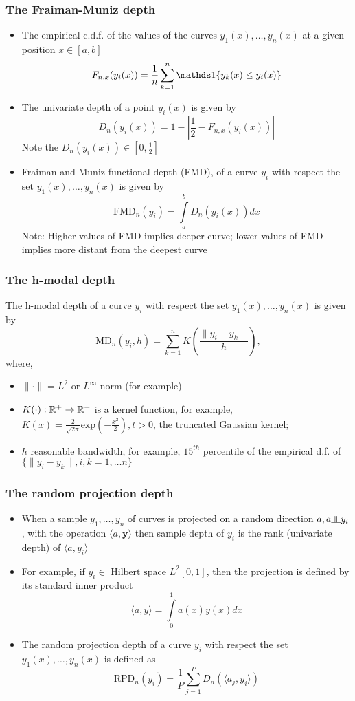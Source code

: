 \documentclass[10pt,dvipsnames,table]{beamer}
\begin{document}
\begin{frame}
\frametitle{The Fraiman-Muniz depth}
\small
\begin{itemize}
\item The empirical c.d.f. of the values of the curves $y_1(x), \dots , y_n(x)$ at a given position $x \in [a, b]$
\[ F_{n,x} (y_i (x)) = \frac{1}{n}\sum\limits_{k=1}^{n} \Ind\{ y_k(x) \leq y_i(x)\}\]
\item The univariate depth of a point $y_i(x)$ is given by
\[ D_n(y_i(x)) = 1 - \left| \frac{1}{2} - F_{n,x} (y_i (x)) \right| \]
Note the $D_n(y_i(x)) \in [0, \frac{1}{2}]$
\item Fraiman and Muniz functional depth (FMD), of a curve $y_i$ with respect the set $y_1(x), \dots , y_n(x)$ is given by 
\[ \text{FMD}_n(y_i) = \int\limits_a^b D_n(y_i(x)) dx \]
Note: Higher values of FMD implies deeper curve; lower values of FMD implies more distant from the deepest curve
\end{itemize}
\end{frame}

\begin{frame}
\frametitle{The h-modal depth}
The h-modal depth of a curve $y_i$ with respect the set $y_1(x), \dots , y_n(x)$ is given by
\[ \text{MD}_n(y_i, h) = \sum\limits_{k = 1}^n K\left( \frac{\|y_i - y_k \|}{h} \right),\]
where, \begin{itemize}
\item $\|\cdot\| = L^2 \text{ or } L^{\infty}$ norm (for example)
\item $K(\cdot): \mathbb{R}^{+} \rightarrow \mathbb{R}^{+}$ is a kernel function, for example, $K(x) = \frac{2}{\sqrt{2\pi}} \text{exp}\left(-\frac{x^2}{2}\right), t > 0$, the truncated Gaussian kernel;
\item $h$ reasonable bandwidth, for example, $15^{th}$ percentile of the empirical d.f. of $\{ \|y_i - y_k \|, i, k = 1, \dots n \}$
\end{itemize}
\end{frame}

\begin{frame}
\frametitle{The random projection depth}
\begin{itemize}
\item When a sample $y_1, \dots, y_n$ of curves is projected on a random direction $a, a \indep y_i$, with the operation $ \langle a, \mathbf{y} \rangle$ then sample depth of $y_i$ is the rank (univariate depth) of $ \langle a, y_i \rangle$
\item For example, if $y_i \in \text{ Hilbert space } L^2[0,1]$, then the projection is defined by its standard inner product 
\[ \langle a, y \rangle = \int\limits_0^1 a(x) y(x) dx\]
\item The random projection depth of a curve $y_i$ with respect the set $y_1(x), \dots , y_n(x)$ is defined as
\[ \text{RPD}_n(y_i) = \frac{1}{P} \sum\limits_{j = 1}^P D_n(\langle a_j, y_i \rangle)\]
\end{itemize}
\end{frame}
\end{document}

